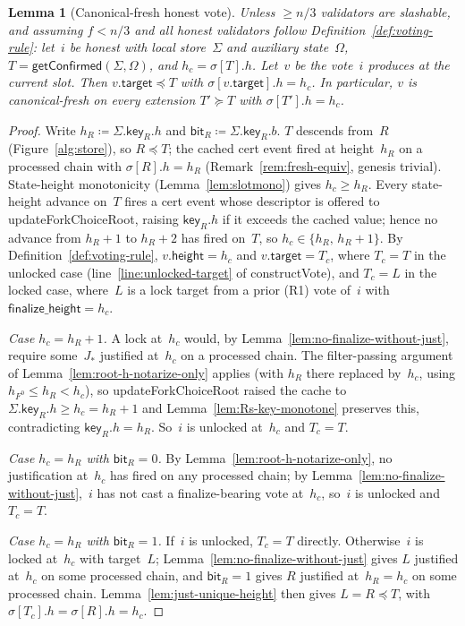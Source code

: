 \ifx\litemode\undefined\documentclass{article}\fi
\newcommand{\target}{\mathsf{target}}
\newcommand{\height}{\mathsf{height}}
\newcommand{\finalizeHeight}{\mathsf{finalize\_height}}
\newcommand{\key}{\mathsf{key}}
\newcommand{\bit}{\mathsf{bit}}
\newcommand{\constructVote}{\textsf{constructVote}\xspace}
\newcommand{\updateForkChoiceRoot}{\textsf{updateForkChoiceRoot}\xspace}
\newcommand{\getConfirmed}{\textsf{getConfirmed}\xspace}
\theoremstyle{plain}
\newtheorem{lemma}{Lemma}
\theoremstyle{definition}
\theoremstyle{remark}
\begin{document}
\begin{lemma}[Canonical-fresh honest vote]\label{lem:canonical-fresh-honest-vote}
Unless $\geq n/3$ validators are slashable, and assuming $f < n/3$ and all honest validators follow Definition~\ref{def:voting-rule}: let~$i$ be honest with local store~$\Sigma$ and auxiliary state~$\Omega$, $T = \getConfirmed(\Sigma, \Omega)$, and $h_c = \sigma[T].h$.
Let~$v$ be the vote~$i$ produces at the current slot.
Then $v.\target \preceq T$ with $\sigma[v.\target].h = h_c$.
In particular, $v$ is canonical-fresh on every extension $T' \succeq T$ with $\sigma[T'].h = h_c$.
\end{lemma}

\begin{proof}
Write $h_R \coloneqq \Sigma.\key_R.h$ and $\bit_R \coloneqq \Sigma.\key_R.b$.
$T$ descends from~$R$ (Figure~\ref{alg:store}), so $R \preceq T$; the cached cert event fired at height~$h_R$ on a processed chain with $\sigma[R].h = h_R$ (Remark~\ref{rem:fresh-equiv}, genesis trivial).
State-height monotonicity (Lemma~\ref{lem:slotmono}) gives $h_c \geq h_R$.
Every state-height advance on~$T$ fires a cert event whose descriptor is offered to \updateForkChoiceRoot, raising $\key_R.h$ if it exceeds the cached value; hence no advance from $h_R + 1$ to $h_R + 2$ has fired on~$T$, so $h_c \in \{h_R,\, h_R + 1\}$.
By Definition~\ref{def:voting-rule}, $v.\height = h_c$ and $v.\target = T_c$, where $T_c = T$ in the unlocked case (line~\ref{line:unlocked-target} of \constructVote{}), and $T_c = L$ in the locked case, where~$L$ is a lock target from a prior (R1) vote of~$i$ with $\finalizeHeight = h_c$.

\emph{Case $h_c = h_R + 1$.}
A lock at~$h_c$ would, by Lemma~\ref{lem:no-finalize-without-just}, require some~$J_\ast$ justified at~$h_c$ on a processed chain.
The filter-passing argument of Lemma~\ref{lem:root-h-notarize-only} applies (with $h_R$ there replaced by~$h_c$, using $h_{F^0} \leq h_R < h_c$), so \updateForkChoiceRoot raised the cache to $\Sigma.\key_R.h \geq h_c = h_R + 1$ and Lemma~\ref{lem:Rs-key-monotone} preserves this, contradicting $\key_R.h = h_R$.
So~$i$ is unlocked at~$h_c$ and $T_c = T$.

\emph{Case $h_c = h_R$ with $\bit_R = 0$.}
By Lemma~\ref{lem:root-h-notarize-only}, no justification at~$h_c$ has fired on any processed chain; by Lemma~\ref{lem:no-finalize-without-just},~$i$ has not cast a finalize-bearing vote at~$h_c$, so~$i$ is unlocked and $T_c = T$.

\emph{Case $h_c = h_R$ with $\bit_R = 1$.}
If~$i$ is unlocked, $T_c = T$ directly.
Otherwise~$i$ is locked at~$h_c$ with target~$L$; Lemma~\ref{lem:no-finalize-without-just} gives $L$ justified at~$h_c$ on some processed chain, and $\bit_R = 1$ gives $R$ justified at~$h_R = h_c$ on some processed chain.
Lemma~\ref{lem:just-unique-height} then gives $L = R \preceq T$, with $\sigma[T_c].h = \sigma[R].h = h_c$.
\end{proof}
\end{document}
